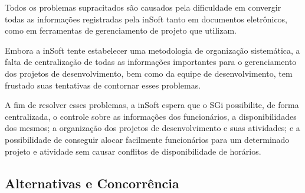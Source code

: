       Todos os problemas supracitados são causados pela dificuldade em convergir todas as informações registradas pela inSoft tanto em documentos eletrônicos, como em ferramentas de gerenciamento de projeto que utilizam.

      Embora a inSoft tente estabelecer uma metodologia de organização sistemática, a falta de centralização de todas as informações importantes para o gerenciamento dos projetos de desenvolvimento, bem como da equipe de desenvolvimento, tem frustado suas tentativas de contornar esses problemas.

      A fim de resolver esses problemas, a inSoft espera que o SGi possibilite, de forma centralizada, o controle sobre as informações dos funcionários, a disponibilidades dos mesmos; a organização dos projetos de desenvolvimento e suas atividades; e a possibilidade de conseguir alocar facilmente funcionários para um determinado projeto e atividade sem causar conflitos de disponibilidade de horários.

    \subsection{Alternativas e Concorrência}

